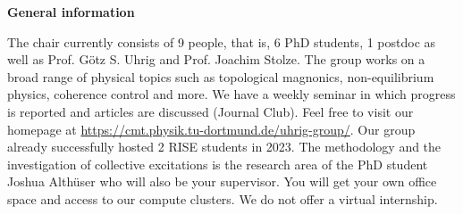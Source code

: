 \documentclass[20pt]{article}
\newcommand{\msection}[1]{ { \vspace{5mm} \hspace{-6mm} \large \textbf{#1}} \vspace{2mm} } %
\begin{document}
\msection{General information}

The chair currently consists of 9 people, that is, 6 PhD students, 1 postdoc as well as Prof. G\"otz S. Uhrig and Prof. Joachim Stolze. 
The group works on a broad range of physical topics such as topological magnonics, non-equilibrium physics, coherence control and more. 
We have a weekly seminar in which progress is reported and articles are discussed (Journal Club). Feel free to visit our homepage at \url{https://cmt.physik.tu-dortmund.de/uhrig-group/}. 
Our group already successfully hosted 2 RISE students in 2023.
The methodology and the investigation of collective excitations is the research area of the PhD student Joshua Alth\"user who will also be your supervisor.
You will get your own office space and access to our compute clusters. We do not offer a virtual internship.

 

\end{document}
